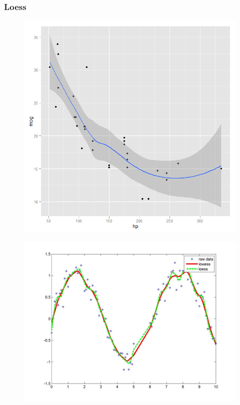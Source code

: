 \documentclass{beamer}
\begin{document}
\begin{frame}
\frametitle{Loess}
	\begin{figure}
\centering
\includegraphics[width=0.8\linewidth]{images/ggplot2loess}

\end{figure}

\end{frame}
\begin{frame}
	\begin{figure}
\centering
\includegraphics[width=1\linewidth]{images/loesslowess}
\caption{}
\label{fig:loesslowess}
\end{figure}

\end{frame}
\end{document}
